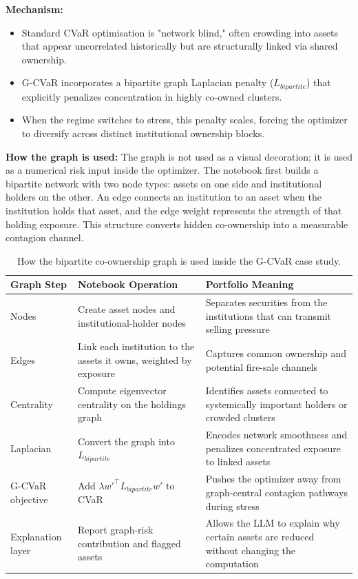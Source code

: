 \documentclass[11pt]{article}
\begin{document}
\textbf{Mechanism:}
\begin{itemize}
  \item Standard CVaR optimisation is "network blind," often crowding into assets that appear uncorrelated historically but are structurally linked via shared ownership.
  \item G-CVaR incorporates a bipartite graph Laplacian penalty ($L_{bipartite}$) that explicitly penalizes concentration in highly co-owned clusters.
  \item When the regime switches to stress, this penalty scales, forcing the optimizer to diversify across distinct institutional ownership blocks.
\end{itemize}

\textbf{How the graph is used:} The graph is not used as a visual decoration; it is used as a numerical risk input inside the optimizer. The notebook first builds a bipartite network with two node types: assets on one side and institutional holders on the other. An edge connects an institution to an asset when the institution holds that asset, and the edge weight represents the strength of that holding exposure. This structure converts hidden co-ownership into a measurable contagion channel.

\begin{table}[htbp]
\centering
\small
\begin{tabular}{L{2.7cm}L{5.0cm}L{4.5cm}}
\toprule
\textbf{Graph Step} & \textbf{Notebook Operation} & \textbf{Portfolio Meaning} \\
\midrule
Nodes & Create asset nodes and institutional-holder nodes & Separates securities from the institutions that can transmit selling pressure \\
Edges & Link each institution to the assets it owns, weighted by exposure & Captures common ownership and potential fire-sale channels \\
Centrality & Compute eigenvector centrality on the holdings graph & Identifies assets connected to systemically important holders or crowded clusters \\
Laplacian & Convert the graph into $L_{bipartite}$ & Encodes network smoothness and penalizes concentrated exposure to linked assets \\
G-CVaR objective & Add $\lambda w'^{\top} L_{bipartite} w'$ to CVaR & Pushes the optimizer away from graph-central contagion pathways during stress \\
Explanation layer & Report graph-risk contribution and flagged assets & Allows the LLM to explain why certain assets are reduced without changing the computation \\
\bottomrule
\end{tabular}
\caption{How the bipartite co-ownership graph is used inside the G-CVaR case study.}
\label{tab:graph_usage_gcvar}
\end{table}
\end{document}
